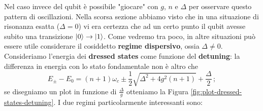 \noindent Nel caso invece del qubit è possibile "giocare" con $g$, $n$ e $\Delta$ per osservare questo pattern di oscillazioni. Nella scorsa sezione abbiamo visto che in una situazione di risonanza esatta ($\Delta = 0$) vi era certezza che ad un certo punto il qubit avesse subito una transizione $\ket{0} \to \ket{1}$. Come vedremo tra poco, in altre situazioni può essere utile considerare il cosiddetto \textbf{regime dispersivo}, ossia $\Delta \neq 0$. Consideriamo l'energia dei \textbf{dressed states} come funzione del \textbf{detuning}: la differenza in energia con lo stato fondamentale non è altro che
\begin{equation*}
    E_\pm - E_0 = (n+1)\omega_c \pm \frac 12\sqrt{\Delta^2+4g^2(n+1)}+\frac \Delta 2 \, ;
\end{equation*}
se disegniamo un plot in funzione di $\frac{\Delta}{g}$ otteniamo la Figura \ref{fig:plot-dressed-states-detuning}. I due regimi particolarmente interessanti sono:
